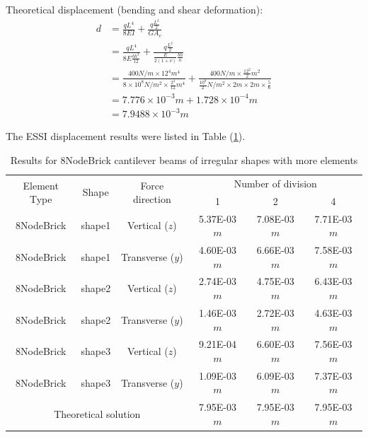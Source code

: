 \documentclass[fleqn,11pt]{article}
\begin{document}
Theoretical displacement (bending and shear deformation):
\begin{equation}
  \begin{aligned}
  d &=\frac{qL^4}{8EI} + \frac{q \frac{L^2}{2}}{GA_v} \\ 
    &=\frac{qL^4}{8E\frac{bh^3}{12} }+\frac{q \frac{L^2}{2}}{\frac{E}{2(1+\nu)}\frac{bh}{\kappa}} \\
    &= \frac{400 N/m \times 12^4 m^4}{8\times 10^8 N/m^2 \times \frac{2^4}{12} m^4} 
       + \frac{400 N/m \times \frac{12^2}{2} m^2} {\frac{10^8}{2} N/m^2 \times 2m\times 2m\times \frac{5}{6}} \\ 
    &=7.776\times 10^{-3} m  +1.728\times 10^{-4} m \\
    &=7.9488\times 10^{-3} m
   \end{aligned}
\end{equation}







The ESSI displacement results were listed in Table (\ref{table Results for 8NodeBrick cantilever beams of irregular shapes with more elements}).
\begin{table}[H]
  \centering
  \caption{Results for 8NodeBrick cantilever beams of irregular shapes with more elements}
  \label{table Results for 8NodeBrick cantilever beams of irregular shapes with more elements}
\begin{tabular}{|c|c|c|c|c|c|}
\hline
\multirow{2}{*}{Element Type} & \multirow{2}{*}{Shape}  & \multirow{2}{*}{Force direction}  & \multicolumn{3}{|c|}{Number of division} \\  \cline{4-6}
                        &        &                  &  1 &  2 &  4  \\ \hline
8NodeBrick              & shape1 & Vertical ($z$)   & 5.37E-03 $m$  & 7.08E-03 $m$  & 7.71E-03  $m$ \\ \hline
8NodeBrick              & shape1 & Transverse ($y$) & 4.60E-03 $m$  & 6.66E-03 $m$  & 7.58E-03  $m$ \\ \hline
8NodeBrick              & shape2 & Vertical ($z$)   & 2.74E-03 $m$& 4.75E-03 $m$& 6.43E-03  $m$ \\ \hline
8NodeBrick              & shape2 & Transverse ($y$) & 1.46E-03 $m$& 2.72E-03 $m$& 4.63E-03  $m$ \\ \hline
8NodeBrick              & shape3 & Vertical ($z$)   & 9.21E-04 $m$  & 6.60E-03 $m$  & 7.56E-03  $m$ \\ \hline
8NodeBrick              & shape3 & Transverse ($y$) & 1.09E-03 $m$  & 6.09E-03 $m$  & 7.37E-03  $m$ \\ \hline
 \multicolumn{3}{|c|}{Theoretical solution}      & 7.95E-03 $m$  & 7.95E-03 $m$  & 7.95E-03  $m$ \\
\hline
\end{tabular}
\end{table}
\end{document}
